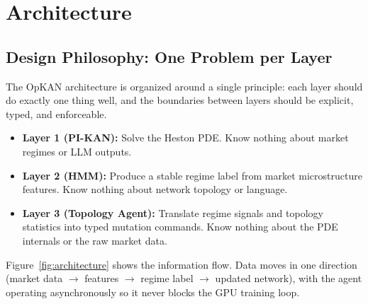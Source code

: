 \documentclass[11pt,a4paper]{article}
\begin{document}
\section{Architecture}
\label{sec:arch}

\subsection{Design Philosophy: One Problem per Layer}

The OpKAN architecture is organized around a single principle: each layer should do
exactly one thing well, and the boundaries between layers should be explicit, typed, and
enforceable.

\begin{itemize}[nosep]
  \item \textbf{Layer 1 (PI-KAN):} Solve the Heston PDE. Know nothing about market
  regimes or LLM outputs.
  \item \textbf{Layer 2 (HMM):} Produce a stable regime label from market
  microstructure features. Know nothing about network topology or language.
  \item \textbf{Layer 3 (Topology Agent):} Translate regime signals and topology
  statistics into typed mutation commands. Know nothing about the PDE internals or
  the raw market data.
\end{itemize}

Figure~\ref{fig:architecture} shows the information flow. Data moves in one direction
(market data $\to$ features $\to$ regime label $\to$ updated network), with the agent
operating asynchronously so it never blocks the GPU training loop.
\end{document}
